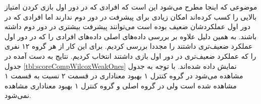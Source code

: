 \documentclass[twoside, a4paper,11pt]{book}
\numberwithin{equation}{chapter}
\numberwithin{table}{chapter}
\numberwithin{figure}{chapter}
\numberwithin{equation}{chapter}
\begin{document}
\begin{table}[]
\end{table}

موضوعی که اینجا مطرح می‌شود این است که افرادی که در دور اول بازی کردن امتیاز بالایی را کسب کرده‌اند امکان زیادی برای پیشرفت در دور دوم ندارند اما افرادی که در دور اول عملکردشان ضعیف بوده است می‌توانند پیشرفت بیشتری در دور دوم داشته باشند. به همین دلیل علاوه بر بررسی داده‌های اصلی داده‌های افرادی را که در دور اول عملکرد ضعیف‌تری داشتند را مجددا بررسی کردیم. برای این کار از هر گروه ۱۲ نفری را که عملکرد ضعیف‌تری در دور اول بازی داشتند انتخاب کردیم. نتایج به دست آمده در جدول \ref{tbl:scoreCompWilcoxWeakOnes} نمایش داده شده‌اند. با توجه به جدول مشاهده می‌شود در گروه کنترل ۱ بهبود معناداری در قسمت ۲ نسبت به قسمت ۱ مشاهده شده است ولی در گروه اصلی و گروه کنترل ۱ بهبود معناداری مشاهده نمی‌شود.
\end{document}

